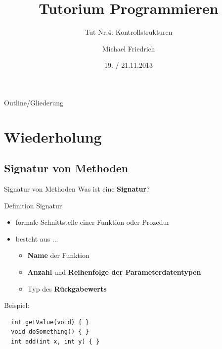 \documentclass[18pt]{beamer}
\title[Prog Tut Nr. 4]{Tutorium Programmieren}
\subtitle{Tut Nr.4: Kontrollstrukturen}
\author{Michael Friedrich}
\date{19. / 21.11.2013}
\institute{Institut f\"ur theoretische Informatik}
\begin{document}

\begin{frame}
	\titlepage
\end{frame}

\begin{frame}{Outline/Gliederung}
	\tableofcontents
\end{frame}

\section{Wiederholung}
\subsection{Signatur von Methoden}
\begin{frame}[fragile]{Signatur von Methoden}
  Was ist eine \textbf{Signatur}?
  \pause
  \begin{block}{Definition Signatur}
    \begin{itemize}
      \item formale Schnittstelle einer Funktion oder Prozedur
      \item besteht aus ...
      \begin{itemize}
        \item \textbf{Name} der Funktion
        \item \textbf{Anzahl} und \textbf{Reihenfolge der Parameterdatentypen}
        \item Typ des \textbf{Rückgabewerts}
      \end{itemize}
    \end{itemize}
  \end{block}
  Beispiel:
  \begin{lstlisting}
  int getValue(void) { }
  void doSomething() { }
  int add(int x, int y) { }\end{lstlisting}
\end{frame}
\end{document}
